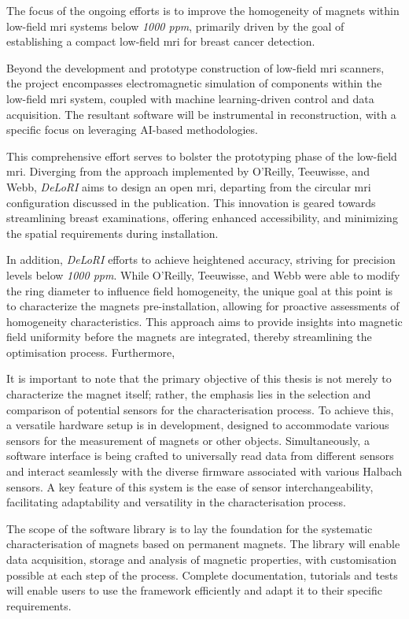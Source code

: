 The focus of the ongoing efforts is to improve the homogeneity of
magnets within low-field \gls{mri} systems below \emph{1000 \gls{ppm}},
primarily driven by the goal of establishing a compact low-field
\gls{mri} for breast cancer detection.

Beyond the development and prototype construction of low-field \gls{mri}
scanners, the project encompasses electromagnetic simulation of
components within the low-field \gls{mri} system, coupled with machine
learning-driven control and data acquisition. The resultant software
will be instrumental in reconstruction, with a specific focus on
leveraging AI-based methodologies.

This comprehensive effort serves to bolster the prototyping phase of the
low-field \gls{mri}. Diverging from the approach implemented by
O'Reilly, Teeuwisse, and Webb, \emph{DeLoRI} aims to design an open
\gls{mri}, departing from the circular \gls{mri} configuration discussed
in the publication. This innovation is geared towards streamlining
breast examinations, offering enhanced accessibility, and minimizing the
spatial requirements during installation.

In addition, \emph{DeLoRI} efforts to achieve heightened accuracy,
striving for precision levels below \emph{1000 \gls{ppm}}. While
O'Reilly, Teeuwisse, and Webb were able to modify the ring diameter to
influence field homogeneity, the unique goal at this point is to
characterize the magnets pre-installation, allowing for proactive
assessments of homogeneity characteristics. This approach aims to
provide insights into magnetic field uniformity before the magnets are
integrated, thereby streamlining the optimisation process. Furthermore,

It is important to note that the primary objective of this thesis is not
merely to characterize the magnet itself; rather, the emphasis lies in
the selection and comparison of potential sensors for the
characterisation process. To achieve this, a versatile hardware setup is
in development, designed to accommodate various sensors for the
measurement of magnets or other objects. Simultaneously, a software
interface is being crafted to universally read data from different
sensors and interact seamlessly with the diverse firmware associated
with various Halbach sensors. A key feature of this system is the ease
of sensor interchangeability, facilitating adaptability and versatility
in the characterisation process.

The scope of the software library is to lay the foundation for the
systematic characterisation of magnets based on permanent magnets. The
library will enable data acquisition, storage and analysis of magnetic
properties, with customisation possible at each step of the process.
Complete documentation, tutorials and tests will enable users to use the
framework efficiently and adapt it to their specific requirements.

